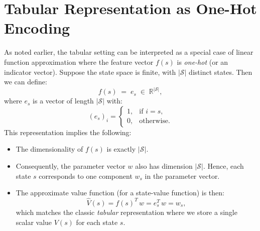 \section{Tabular Representation as One-Hot Encoding}

As noted earlier, the tabular setting can be interpreted as a special case of linear function approximation where the feature vector $f(s)$ is \emph{one-hot} (or an indicator vector). Suppose the state space is finite, with $\lvert \mathcal{S} \rvert$ distinct states. Then we can define:
\[
f(s) \;=\; e_s \;\in\; \mathbb{R}^{\lvert \mathcal{S} \rvert},
\]
where $e_s$ is a vector of length $\lvert \mathcal{S} \rvert$ with:
\[
(e_s)_i 
= 
\begin{cases}
1, & \text{if } i = s,\\
0, & \text{otherwise}.
\end{cases}
\]
This representation implies the following:

\begin{itemize}
    \item The dimensionality of $f(s)$ is exactly $\lvert \mathcal{S} \rvert$.
    \item Consequently, the parameter vector $w$ also has dimension $\lvert \mathcal{S} \rvert$. Hence, each state $s$ corresponds to one component $w_s$ in the parameter vector.
    \item The approximate value function (for a state-value function) is then:
    \[
    \hat{V}(s) 
    = f(s)^T \, w 
    = e_s^T \, w
    = w_s,
    \]
    which matches the classic \emph{tabular} representation where we store a single scalar value $V(s)$ for each state $s$.
\end{itemize}

